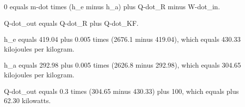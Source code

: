 0 equals m-dot times (h_e minus h_a) plus Q-dot_R minus W-dot_in.  

Q-dot_out equals Q-dot_R plus Q-dot_KF.  

h_e equals 419.04 plus 0.005 times (2676.1 minus 419.04), which equals 430.33 kilojoules per kilogram.  

h_a equals 292.98 plus 0.005 times (2626.8 minus 292.98), which equals 304.65 kilojoules per kilogram.  

Q-dot_out equals 0.3 times (304.65 minus 430.33) plus 100, which equals plus 62.30 kilowatts.